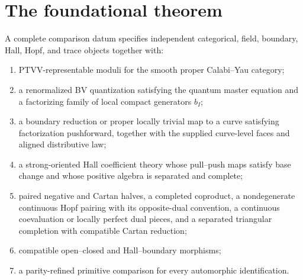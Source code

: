 \section{The foundational theorem}
\begin{definition}
A complete comparison datum specifies independent categorical, field,
boundary, Hall, Hopf, and trace objects together with:
\begin{enumerate}
\item PTVV-representable moduli for the smooth proper Calabi--Yau category;
\item a renormalized BV quantization satisfying the quantum master equation and a factorizing family of local compact generators $b_I$;
\item a boundary reduction or proper locally trivial map to a curve satisfying factorization pushforward, together with the supplied curve-level faces and aligned distributive law;
\item a strong-oriented Hall coefficient theory whose pull--push maps satisfy base change and whose positive algebra is separated and complete;
\item paired negative and Cartan halves, a completed coproduct, a nondegenerate continuous Hopf pairing with its opposite-dual
convention, a continuous coevaluation or locally perfect dual pieces,
and a separated triangular completion with compatible Cartan reduction;
\item compatible open--closed and Hall--boundary morphisms;
\item a parity-refined primitive comparison for every automorphic identification.
\end{enumerate}
\end{definition}

